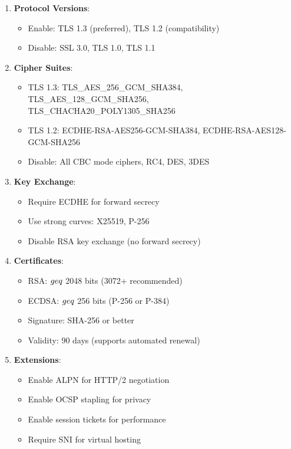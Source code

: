 \documentclass[12pt,a4paper]{article}
\begin{document}
\begin{enumerate}
    \item \textbf{Protocol Versions}:
    \begin{itemize}
        \item Enable: TLS 1.3 (preferred), TLS 1.2 (compatibility)
        \item Disable: SSL 3.0, TLS 1.0, TLS 1.1
    \end{itemize}
    
    \item \textbf{Cipher Suites}:
    \begin{itemize}
        \item TLS 1.3: TLS\_AES\_256\_GCM\_SHA384, TLS\_AES\_128\_GCM\_SHA256, TLS\_CHACHA20\_POLY1305\_SHA256
        \item TLS 1.2: ECDHE-RSA-AES256-GCM-SHA384, ECDHE-RSA-AES128-GCM-SHA256
        \item Disable: All CBC mode ciphers, RC4, DES, 3DES
    \end{itemize}
    
    \item \textbf{Key Exchange}:
    \begin{itemize}
        \item Require ECDHE for forward secrecy
        \item Use strong curves: X25519, P-256
        \item Disable RSA key exchange (no forward secrecy)
    \end{itemize}
    
    \item \textbf{Certificates}:
    \begin{itemize}
        \item RSA: $\\geq$ 2048 bits (3072+ recommended)
        \item ECDSA: $\\geq$ 256 bits (P-256 or P-384)
        \item Signature: SHA-256 or better
        \item Validity: 90 days (supports automated renewal)
    \end{itemize}
    
    \item \textbf{Extensions}:
    \begin{itemize}
        \item Enable ALPN for HTTP/2 negotiation
        \item Enable OCSP stapling for privacy
        \item Enable session tickets for performance
        \item Require SNI for virtual hosting
    \end{itemize}
\end{enumerate}
\end{document}
